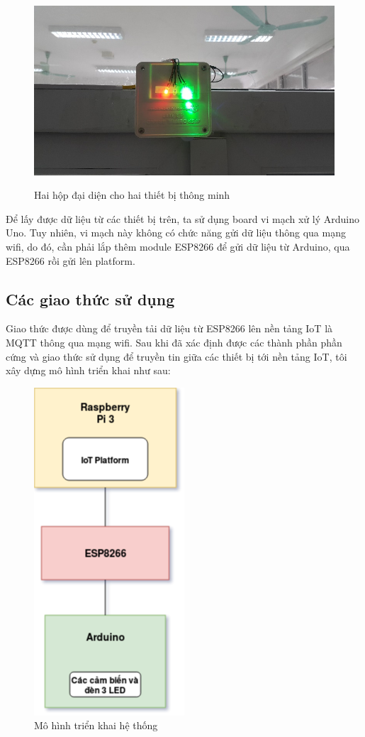 \begin{figure}
	\center
	\includegraphics[scale=1]{image/hop_2}
	\label{fig:2hop}
	\caption{Hai hộp đại diện cho hai thiết bị thông minh}
\end{figure}

Để lấy được dữ liệu từ các thiết bị trên, ta sử dụng board vi mạch xử lý Arduino Uno. Tuy nhiên, vi mạch này không có chức năng gửi dữ liệu thông qua mạng wifi, do đó, cần phải lắp thêm module ESP8266 để gửi dữ liệu từ Arduino, qua ESP8266 rồi gửi lên platform.
\subsection{Các giao thức sử dụng}
Giao thức được dùng để truyền tải dữ liệu từ ESP8266 lên nền tảng IoT là MQTT thông qua mạng wifi. Sau khi đã xác định được các thành phần phần cứng và giao thức sử dụng để truyền tin giữa các thiết bị tới nền tảng IoT, tôi xây dựng mô hình triển khai như sau: \\
\clearpage
\begin{figure}[h!]
	\center
	\includegraphics[scale=0.6]{image/mo_hinh_trien_khai_phan_cung}
	\caption{Mô hình triển khai hệ thống}
	
	\label{fig:mo_hinh_trien_khai_phan_cung}
\end{figure}

